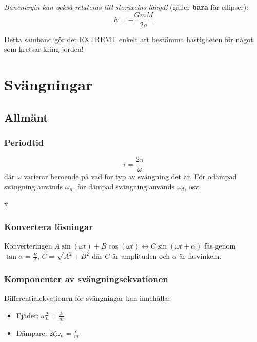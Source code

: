 \documentclass{article}
\newenvironment{ankiflashcard}[1]{}{}
\begin{document}
\begin{paracol}{2}
\begin{ankiflashcard}{Relatera banenergi till storaxelns längd.}
\textit{Banenergin kan också relateras till storaxelns längd!} (gäller \textbf{bara} för ellipser):
$$
E = -\frac{GmM}{2a}
$$

\small{Detta samband gör det EXTREMT enkelt att bestämma hastigheten för något som kretsar kring jorden!}
\end{ankiflashcard}
\section{Svängningar}
\subsection{Allmänt}

\begin{ankiflashcard}{Definiera periodtiden för svängningar.}
\subsubsection{Periodtid}
$$\tau = \frac{2\pi}{\omega}$$
där $\omega$ varierar beroende på vad för typ av svängning det är. För odämpad svängning används $\omega_n$, för dämpad svängning används $\omega_d$, osv.
\end{ankiflashcard}


\begin{ankiflashcard}{Hur kan man konvertera mellan lösningar för svängningsekvationen?}
x\subsubsection{Konvertera lösningar}
Konverteringen $A\sin(\omega t)+B\cos(\omega t) \leftrightarrow C\sin(\omega t + \alpha)$ fås genom
$\tan \alpha = \frac{B}{A}$, $C=\sqrt{A^2+B^2}$ där $C$ är amplituden och $\alpha$ är fasvinkeln.
\end{ankiflashcard}

\subsubsection{Komponenter av svängningsekvationen}
Differentialekvationen för svängningar kan innehålla:

\begin{ankiflashcard}{Definiera beteckningarna för fjäder och dämpare.}
    
\begin{itemize}
    \item Fjäder: $\omega_n^2 = \frac k m$
    \item Dämpare: $2\zeta \omega_n = \frac c m$
\end{itemize}
\end{ankiflashcard}

\end{paracol}
\end{document}
